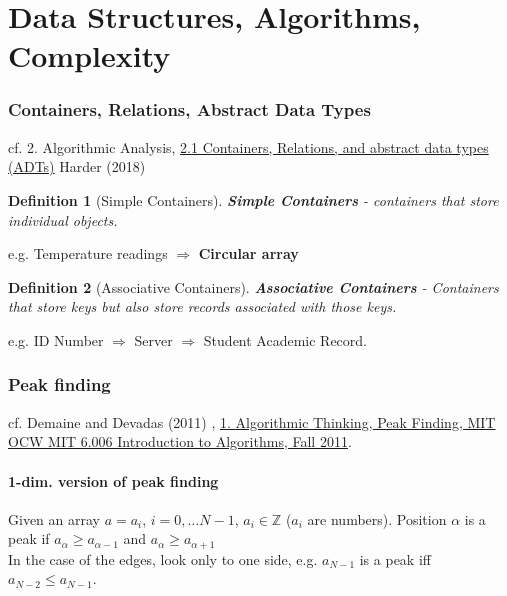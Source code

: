 \documentclass[10pt]{amsart}
\newtheorem{definition}{Definition}
\begin{document}
\part{Data Structures, Algorithms, Complexity}

\section{Containers, Relations, Abstract Data Types}

cf. 2. Algorithmic Analysis, \href{https://ece.uwaterloo.ca/~dwharder/aads/Lecture_materials/2.01.Containers_relations_ADTs.pptx}{2.1 Containers, Relations, and abstract data types (ADTs)} Harder (2018) \cite{Hard2018}

\begin{definition}[Simple Containers]
	\textbf{Simple Containers} - containers that store individual objects.
\end{definition} 
e.g. Temperature readings $\Longrightarrow$ \textbf{Circular array}

\begin{definition}[Associative Containers]
	\textbf{Associative Containers} - Containers that store keys but also store records associated with those keys.
\end{definition} 
e.g. ID Number $\Longrightarrow $ Server $\Longrightarrow$ Student Academic Record.



\section{Peak finding}

cf. Demaine and Devadas (2011) \cite{DeDe2001}, \href{https://youtu.be/HtSuA80QTyo}{1. Algorithmic Thinking, Peak Finding, MIT OCW MIT 6.006 Introduction to Algorithms, Fall 2011}. 

\subsection{1-dim. version of peak finding}

Given an array $a= a_i$, $i=0, \dots N-1$, $a_i \in \mathbb{Z}$ ($a_i$ are numbers). Position $\alpha$ is a peak if $a_{\alpha} \geq a_{\alpha-1}$ and $a_{\alpha} \geq a_{\alpha + 1}$ \\

In the case of the edges, look only to one side, e.g. $a_{N-1}$ is a peak iff $a_{N-2} \leq a_{N-1}$. \\
\end{document}
